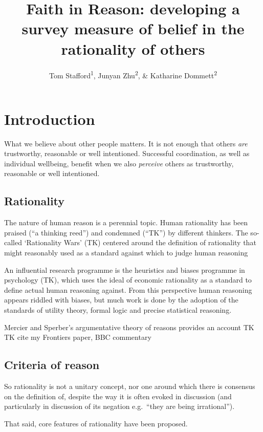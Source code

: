 \documentclass[
  ,jou,floatsintext]{apa6}
\title{Faith in Reason: developing a survey measure of belief in the rationality of others}
\author{Tom Stafford\textsuperscript{1}, Junyan Zhu\textsuperscript{2}, \& Katharine Dommett\textsuperscript{2}}
\date{}
\affiliation{\vspace{0.5cm}\textsuperscript{1} Department of Psychology, University of Sheffield, UK\\\textsuperscript{2} Department of Politics and International Relations, University of Sheffield, UK}
\begin{document}
\maketitle

\hypertarget{introduction}{%
\section{Introduction}\label{introduction}}

What we believe about other people matters. It is not enough that others \emph{are} trustworthy, reasonable or well intentioned. Successful coordination, as well as individual wellbeing, benefit when we also \emph{perceive} others as trustworthy, reasonable or well intentioned.

\hypertarget{rationality}{%
\subsection{Rationality}\label{rationality}}

The nature of human reason is a perennial topic. Human rationality has been praised (``a thinking reed'') and condemned (``TK'') by different thinkers. The so-called `Rationality Wars' (TK) centered around the definition of rationality that might reasonably used as a standard against which to judge human reasoning

An influential research programme is the heuristics and biases programme in psychology (TK), which uses the ideal of economic rationality as a standard to define actual human reasoning against. From this perspective human reasoning appears riddled with biases, but much work is done by the adoption of the standards of utility theory, formal logic and precise statistical reasoning.

Mercier and Sperber's argumentative theory of reasons provides an account TK
TK cite my Frontiers paper, BBC commentary

\hypertarget{criteria-of-reason}{%
\subsection{Criteria of reason}\label{criteria-of-reason}}

So rationality is not a unitary concept, nor one around which there is consensus on the definition of, despite the way it is often evoked in discussion (and particularly in discussion of its negation e.g.~``they are being irrational'').

That said, core features of rationality have been proposed.
\end{document}
